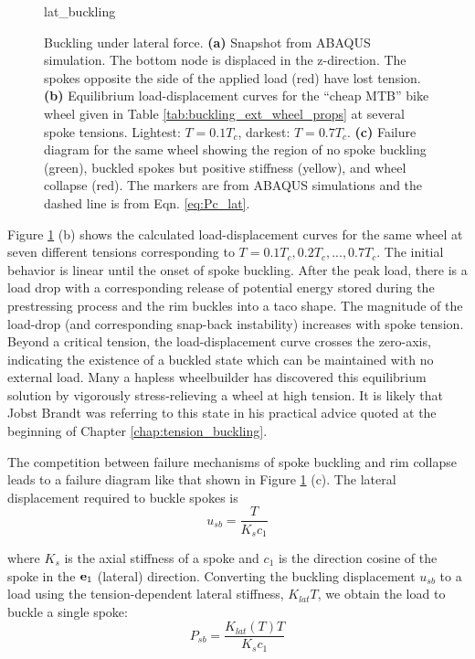 \documentclass[\rootdir/thesis.tex]{subfiles}
\begin{document}
\begin{figure}
\centering
{lat_buckling} 
\caption{Buckling under lateral force. \textbf{(a)} Snapshot from ABAQUS simulation. The bottom node is displaced in the z-direction. The spokes opposite the side of the applied load (red) have lost tension. \textbf{(b)} Equilibrium load-displacement curves for the ``cheap MTB'' bike wheel given in Table \ref{tab:buckling_ext_wheel_props} at several spoke tensions. Lightest: $T=0.1T_c$, darkest: $T=0.7T_c$. \textbf{(c)} Failure diagram for the same wheel showing the region of no spoke buckling (green), buckled spokes but positive stiffness (yellow), and wheel collapse (red). The markers are from ABAQUS simulations and the dashed line is from Eqn. \eqref{eq:Pc_lat}.}
\label{fig:lat_buckling}
\end{figure}

Figure \ref{fig:lat_buckling} (b) shows the calculated load-displacement curves for the same wheel at seven different tensions corresponding to $T=0.1T_c, 0.2T_c,...,0.7T_c$. The initial behavior is linear until the onset of spoke buckling. After the peak load, there is a load drop with a corresponding release of potential energy stored during the prestressing process and the rim buckles into a taco shape. The magnitude of the load-drop (and corresponding snap-back instability) increases with spoke tension. Beyond a critical tension, the load-displacement curve crosses the zero-axis, indicating the existence of a buckled state which can be maintained with no external load. Many a hapless wheelbuilder has discovered this equilibrium solution by vigorously stress-relieving a wheel at high tension. It is likely that Jobst Brandt was referring to this state in his practical advice quoted at the beginning of Chapter \ref{chap:tension_buckling}.

The competition between failure mechanisms of spoke buckling and rim collapse leads to a failure diagram like that shown in Figure \ref{fig:lat_buckling} (c). The lateral displacement required to buckle spokes is
\begin{equation}
u_{sb} = \frac{T}{K_s c_1}
\end{equation}

where $K_s$ is the axial stiffness of a spoke and $c_1$ is the direction cosine of the spoke in the $\mathbf{e}_1$ (lateral) direction. Converting the buckling displacement $u_{sb}$ to a load using the tension-dependent lateral stiffness, $K_{lat}{T}$, we obtain the load to buckle a single spoke:
\begin{equation}
\label{eq:Pc_lat}
P_{sb} = \frac{K_{lat}(T) T}{K_s c_1}
\end{equation}
\end{document}

